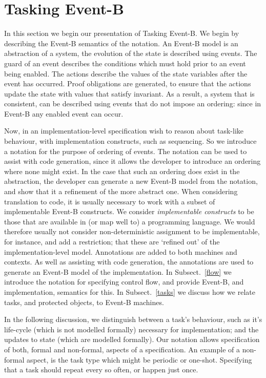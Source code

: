 \section{Tasking Event-B}\label{TEB}
In this section we begin our presentation of Tasking Event-B. We begin by describing the Event-B semantics of the notation. An Event-B model is an abstraction of a system, the evolution of the state is described using events. The guard of an event describes the conditions which must hold prior to an event being enabled. The actions describe the values of the state variables after the event has occurred. Proof obligations are generated, to ensure that the actions update the state with values that satisfy invariant. As a result, a system that is consistent, can be described using events that do not impose an ordering: since in Event-B any enabled event can occur.

Now, in an implementation-level specification wish to reason about task-like behaviour, with implementation constructs, such as sequencing. So we introduce a notation for the purpose of ordering of events. The notation can be used to assist with code generation, since it allows the developer to introduce an ordering where none might exist. In the case that such an ordering does exist in the abstraction, the developer can generate a new Event-B model from the notation, and show that it a refinement of the more abstract one.  When considering translation to code, it is usually necessary to work with a subset of implementable Event-B constructs. We consider \emph{implementable constructs} to be those that are available in (or map well to) a programming language. We would therefore usually not consider non-deterministic assignment to be implementable, for instance, and add a restriction; that these are `refined out' of the implementation-level model. Annotations are added to both machines and contexts. As well as assisting with code generation, the annotations are used to generate an Event-B model of the implementation. In Subsect.~\ref{flow} we introduce the notation for specifying control flow, and provide Event-B, and implementation, semantics for this. In Subsect.~\ref{tasks} we discuss how we relate tasks, and protected objects, to Event-B machines.

In the following discussion, we distinguish between a task's behaviour, such as it's life-cycle (which is not modelled formally) necessary for implementation; and the updates to state (which are modelled formally). Our notation allows specification of both, formal and non-formal, aspects of a specification. An example of a non-formal aspect, is the task type which might be periodic or one-shot. Specifying that a task should repeat every so often, or happen just once. 



